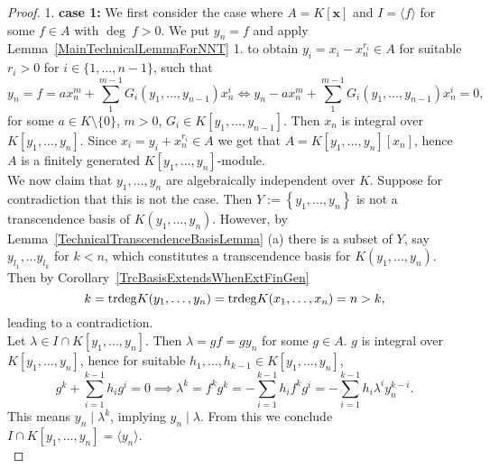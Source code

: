     \begin{proof}
        1. \textbf{case 1:} We first consider the case where $A= K[\mathbf{x}]$ and $I=\langle f\rangle$ for some $f\in A$ with $\deg\ f>0$. We put $y_n = f$ and apply Lemma~\ref{MainTechnicalLemmaForNNT} 1. to obtain $y_i=x_i-x_n^{r_i}\in A$ for suitable $r_i>0$ for $i\in\{1,\dots,n-1\}$, such that
        $$y_n=f=ax_n^m+\sum_1^{m-1} G_i(y_1,\dots,y_{n-1})x_n^i \iff y_n-ax_n^m+\sum_1^{m-1} G_i(y_1,\dots,y_{n-1})x_n^i=0,$$
        for some $a\in K\setminus\{0\}$, $m>0$, $G_i\in K[y_1,\dots,y_{n-1}]$. Then $x_n$ is integral over $K[y_1,\dots,y_{n}]$. Since $x_i=y_i+x_n^{r_i}\in A$ we get that $A=K[y_1,\dots,y_n][x_n]$, hence $A$ is a finitely generated $K[y_1,\dots,y_n]$-module.\\
        We now claim that $y_1,\dots, y_n$ are algebraically independent over $K$. Suppose for contradiction that this is not the case. Then $Y:=\left\{y_1,\dots,y_n\right\}$ is not a transcendence basis of $K(y_1,\dots,y_n)$. However, by Lemma~\ref{TechnicalTranscendenceBasisLemma} (a) there is a subset of $Y$, say $y_{l_1},\dots y_{l_k}$ for $k<n$, which constitutes a transcendence basis for $K(y_1,\dots,y_n)$. Then by Corollary~\ref{TrcBasisExtendsWhenExtFinGen} 
        $$
            k=\mathrm{trdeg } K(y_1,\dots,y_n)=\mathrm{trdeg } K(x_1,\dots,x_n)=n>k,
        $$ 
        leading to a contradiction.\\
        Let $\lambda\in I\cap K[y_1,\dots,y_n]$. Then $\lambda = g f=g y_n$ for some $g\in A$. $g$ is integral over $K[y_1,\dots,y_n]$, hence for suitable $h_1,\dots,h_{k-1}\in K[y_1,\dots,y_n]$,
        $$g^k+\sum_{i=1}^{k-1}h_ig^i=0\implies \lambda^k=f^kg^k=-\sum_{i=1}^{k-1}h_if^kg^i=-\sum_{i=1}^{k-1}h_i\lambda^iy_n^{k-i}.$$
        This means $y_n \mid \lambda^k$, implying $y_n \mid \lambda$. From this we conclude $I\cap K[y_1,\dots,y_n] =\langle y_n \rangle$.\\


\end{proof}
